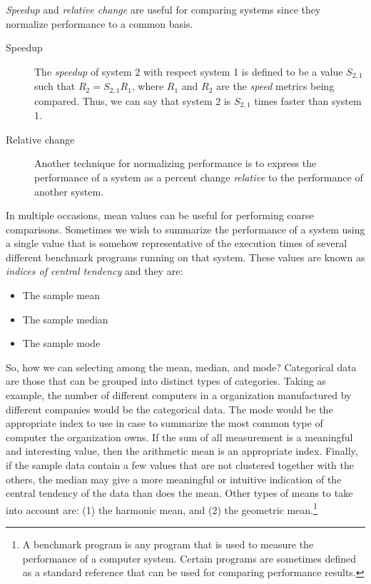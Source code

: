 \documentclass[openany, a4paper]{book}
\theoremstyle{break}
\theoremstyle{example}
\theoremstyle{note}
\theoremstyle{break}
\theoremstyle{exercise}
\begin{document}
\emph{Speedup} and \emph{relative change} are useful for comparing systems since they
normalize performance to a common basis.

\begin{description}
\item[{Speedup}] The \emph{speedup} of system 2 with respect system 1 is defined to be a
value \(S_{2,1}\) such that \(R_2 = S_{2,1}R_1\), where \(R_1\) and \(R_2\)
are the \emph{speed} metrics being compared. Thus, we can say that system 2 is
\(S_{2,1}\) times faster than system 1.
\item[{Relative change}] Another technique for normalizing performance is to
express the performance of a system as a percent change \emph{relative} to the
performance of another system.
\end{description}

In multiple occasions, mean values can be useful for performing coarse
comparisons. Sometimes we wish to summarize the performance of a system using
a single value that is somehow representative of the execution times of
several different benchmark programs running on that system. These values are
known as \emph{indices of central tendency} and they are:

\begin{itemize}
\item The sample mean
\item The sample median
\item The sample mode
\end{itemize}

So, how we can selecting among the mean, median, and mode? Categorical data
are those that can be grouped into distinct types of categories. Taking as
example, the number of different computers in a organization manufactured by
different companies would be the categorical data. The mode would be the
appropriate index to use in case to summarize the most common type of
computer the organization owns. If the sum of all measurement is a meaningful
and interesting value, then the arithmetic mean is an appropriate
index. Finally, if the sample data contain a few values that are not
clustered together with the others, the median may give a more meaningful or
intuitive indication of the central tendency of the data than does the
mean. Other types of means to take into account are: (1) the harmonic mean,
and (2) the geometric mean.\footnote{A benchmark program is any program that is used to measure the
performance of a computer system. Certain programs are sometimes defined as a
standard reference that can be used for comparing performance results.}
\end{document}
